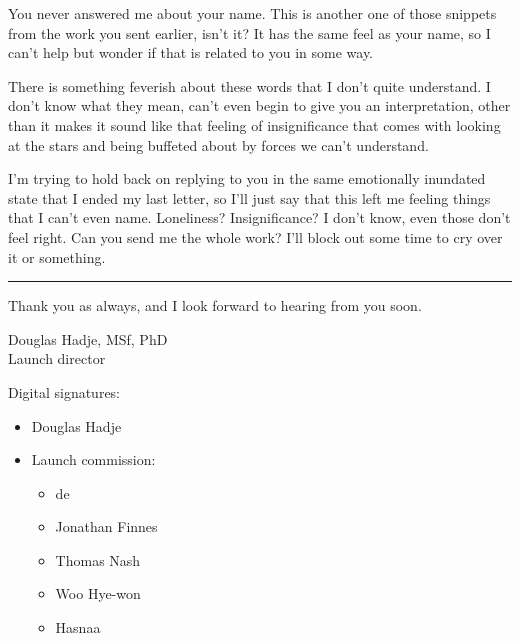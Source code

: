 \noindent You never answered me about your name. This is another one of those snippets from the work you sent earlier, isn't it? It has the same feel as your name, so I can't help but wonder if that is related to you in some way.

There is something feverish about these words that I don't quite understand. I don't know what they mean, can't even begin to give you an interpretation, other than it makes it sound like that feeling of insignificance that comes with looking at the stars and being buffeted about by forces we can't understand.

I'm trying to hold back on replying to you in the same emotionally inundated state that I ended my last letter, so I'll just say that this left me feeling things that I can't even name. Loneliness? Insignificance? I don't know, even those don't feel right. Can you send me the whole work? I'll block out some time to cry over it or something.

\begin{center}\rule{0.5\linewidth}{0.5pt}\end{center}

Thank you as always, and I look forward to hearing from you soon.

Douglas Hadje, MSf, PhD\\
\indent Launch director

Digital signatures:

\begin{itemize}
\tightlist
\item
  Douglas Hadje
\item
  Launch commission:

  \begin{itemize}
  \tightlist
  \item
    de
  \item
    Jonathan Finnes
  \item
    Thomas Nash
  \item
    Woo Hye-won
  \item
    Hasnaa
  \end{itemize}
\end{itemize}
